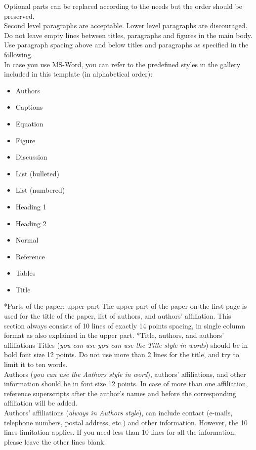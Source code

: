 \documentclass[twocolumn, a4paper,10pt]{article}
\makeatletter
\renewcommand\section{\@startsection{section}{1}{\z@}{3pt}{3pt}{\normalfont\large\bfseries}}
\renewcommand\subsection{\@startsection{subsection}{1}{\z@}{\z@}{\z@}{\normalfont\normalsize\bfseries}}
\renewcommand\subsection{\@startsection{subsection}{1}{\z@}{\z@}{0.1pt}{\normalfont\normalsize\bfseries}}
\makeatother
\begin{document}
Optional parts can be replaced according to the needs but the order should be preserved.\\
Second level paragraphs are acceptable. Lower level paragraphs are discouraged.\\
Do not leave empty lines between titles, paragraphs and figures in the main body. Use paragraph spacing above and below titles and paragraphs as specified in the following. \\
In case you use MS-Word, you can refer to the predefined styles in the gallery included in this template (in alphabetical order):
\begin{itemize}
\item Authors
\item Captions
\item Equation
\item Figure
\item Discussion
\item List (bulleted)
\item List (numbered)
\item Heading 1
\item Heading 2
\item Normal
\item Reference
\item Tables
\item Title
\end{itemize}
\section*{Parts of the paper: upper part}
The upper part of the paper on the first page is used for the title of the paper, list of authors, and authors’ affiliation. This section always consists of 10 lines of exactly 14 points spacing, in single column format as also explained in the upper part.
\subsection*{Title, authors, and authors' affiliations}
Titles (\textit{you can use you can use the Title style in words}) should be in bold font size 12 points. Do not use more than 2 lines for the title, and try to limit it to ten words.\\
Authors (\textit{you can use the Authors style in word}), authors' affiliations, and other information should be in font size 12 points. In case of more than one affiliation, reference superscripts after the author's names and before the corresponding affiliation will be added.\\
Authors' affiliations (\textit{always in Authors style}), can include contact (e-mails, telephone numbers, postal address, etc.) and other information. However, the 10 lines limitation applies. If you need less than 10 lines for all the information, please leave the other lines blank.
\end{document}
